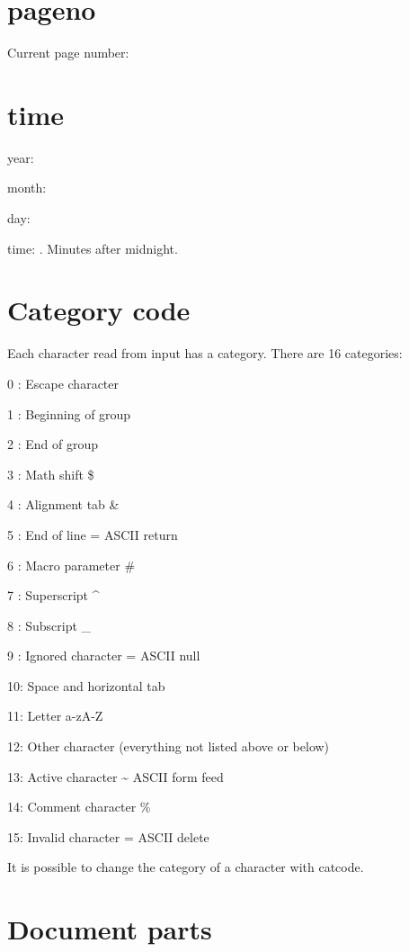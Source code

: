   \break

\section{pageno}

  Current page number: \number\pageno

\section{time}

  year:  \number\year

  month: \number\month

  day:   \number\day

  time:  \number\time. Minutes after midnight.

\section{Category code}

  Each character read from input has a category. There are 16 categories:

  0 : Escape character \bs

  1 : Beginning of group \bo

  2 : End of group \bc

  3 : Math shift \$

  4 : Alignment tab \&

  5 : End of line = ASCII return

  6 : Macro parameter \#

  7 : Superscript \^{}

  8 : Subscript \_

  9 : Ignored character = ASCII null

  10: Space and horizontal tab

  11: Letter a-zA-Z

  12: Other character (everything not listed above or below)

  13: Active character \~{} ASCII form feed

  14: Comment character \%

  15: Invalid character = ASCII delete

  It is possible to change the category of a character with \bs catcode.

\section{Document parts}

